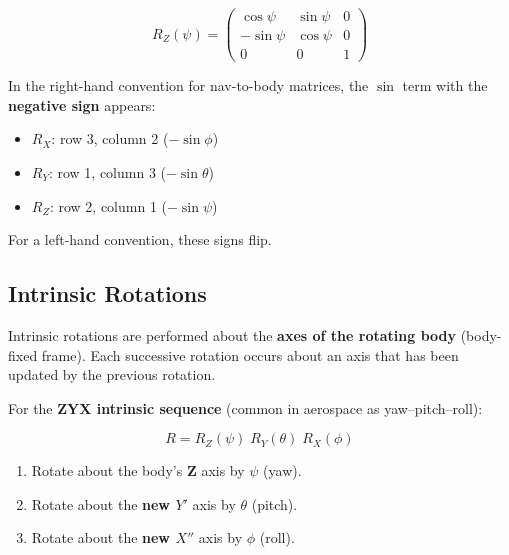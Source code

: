 \documentclass[12pt,a4paper]{article}
\begin{document}
\begin{equation}
  R_Z(\psi) = \begin{pmatrix}
    \cos\psi  & \sin\psi  & 0 \\
    -\sin\psi & \cos\psi  & 0 \\
    0          & 0           & 1
  \end{pmatrix}
  \label{eq:Rz}
\end{equation}

\begin{keybox}
In the right-hand convention for nav-to-body matrices, the $\sin$ term with
the \textbf{negative sign} appears:
\begin{itemize}
  \item $R_X$: row 3, column 2 \quad ($-\sin\phi$)
  \item $R_Y$: row 1, column 3 \quad ($-\sin\theta$)
  \item $R_Z$: row 2, column 1 \quad ($-\sin\psi$)
\end{itemize}
For a left-hand convention, these signs flip.
\end{keybox}

\subsection{Intrinsic Rotations}

Intrinsic rotations are performed about the \textbf{axes of the rotating body}
(body-fixed frame). Each successive rotation occurs about an axis that has been
updated by the previous rotation.

For the \textbf{ZYX intrinsic sequence} (common in aerospace as
yaw--pitch--roll):

\begin{equation}
  R = R_Z(\psi)\; R_Y(\theta)\; R_X(\phi)
\end{equation}

\begin{enumerate}
  \item Rotate about the body's \textbf{Z} axis by $\psi$ (yaw).
  \item Rotate about the \textbf{new $Y'$} axis by $\theta$ (pitch).
  \item Rotate about the \textbf{new $X''$} axis by $\phi$ (roll).
\end{enumerate}
\end{document}
